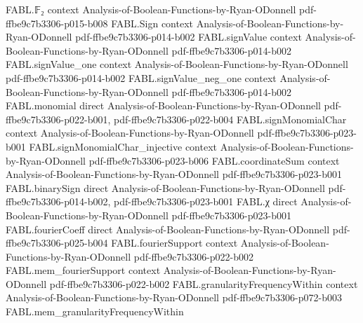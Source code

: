 \begin{theorem}
\label{FABL.eval_parityBottomNextLayer}
\leanok
{}
\proofstep
  {FABL.𝔽₂}
  {context}
  {Analysis-of-Boolean-Functions-by-Ryan-ODonnell}
  {pdf-ffbe9c7b3306-p015-b008}
\proofstep
  {FABL.Sign}
  {context}
  {Analysis-of-Boolean-Functions-by-Ryan-ODonnell}
  {pdf-ffbe9c7b3306-p014-b002}
\proofstep
  {FABL.signValue}
  {context}
  {Analysis-of-Boolean-Functions-by-Ryan-ODonnell}
  {pdf-ffbe9c7b3306-p014-b002}
\proofstep
  {FABL.signValue_one}
  {context}
  {Analysis-of-Boolean-Functions-by-Ryan-ODonnell}
  {pdf-ffbe9c7b3306-p014-b002}
\proofstep
  {FABL.signValue_neg_one}
  {context}
  {Analysis-of-Boolean-Functions-by-Ryan-ODonnell}
  {pdf-ffbe9c7b3306-p014-b002}
\proofstep
  {FABL.monomial}
  {direct}
  {Analysis-of-Boolean-Functions-by-Ryan-ODonnell}
  {pdf-ffbe9c7b3306-p022-b001,
    pdf-ffbe9c7b3306-p022-b004}
\proofstep
  {FABL.signMonomialChar}
  {context}
  {Analysis-of-Boolean-Functions-by-Ryan-ODonnell}
  {pdf-ffbe9c7b3306-p023-b001}
\proofstep
  {FABL.signMonomialChar_injective}
  {context}
  {Analysis-of-Boolean-Functions-by-Ryan-ODonnell}
  {pdf-ffbe9c7b3306-p023-b006}
\proofstep
  {FABL.coordinateSum}
  {context}
  {Analysis-of-Boolean-Functions-by-Ryan-ODonnell}
  {pdf-ffbe9c7b3306-p023-b001}
\proofstep
  {FABL.binarySign}
  {direct}
  {Analysis-of-Boolean-Functions-by-Ryan-ODonnell}
  {pdf-ffbe9c7b3306-p014-b002,
    pdf-ffbe9c7b3306-p023-b001}
\proofstep
  {FABL.χ}
  {direct}
  {Analysis-of-Boolean-Functions-by-Ryan-ODonnell}
  {pdf-ffbe9c7b3306-p023-b001}
\proofstep
  {FABL.fourierCoeff}
  {direct}
  {Analysis-of-Boolean-Functions-by-Ryan-ODonnell}
  {pdf-ffbe9c7b3306-p025-b004}
\proofstep
  {FABL.fourierSupport}
  {context}
  {Analysis-of-Boolean-Functions-by-Ryan-ODonnell}
  {pdf-ffbe9c7b3306-p022-b002}
\proofstep
  {FABL.mem_fourierSupport}
  {context}
  {Analysis-of-Boolean-Functions-by-Ryan-ODonnell}
  {pdf-ffbe9c7b3306-p022-b002}
\proofstep
  {FABL.granularityFrequencyWithin}
  {context}
  {Analysis-of-Boolean-Functions-by-Ryan-ODonnell}
  {pdf-ffbe9c7b3306-p072-b003}
\proofstep
  {FABL.mem_granularityFrequencyWithin}

\end{theorem}

